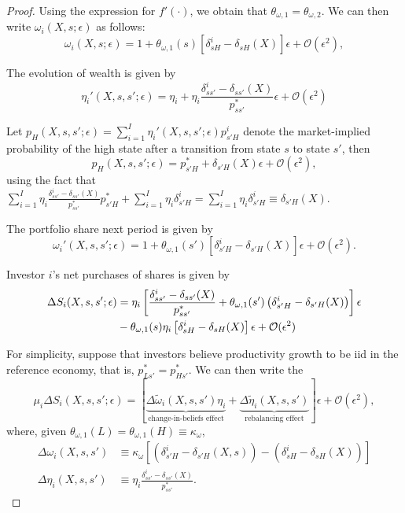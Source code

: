 \begin{proof}
Using the expression for $f'(\cdot)$, we obtain that $\theta_{\omega,1} = \theta_{\omega,2}$. We can then write $\omega_{i}(X,s;\epsilon)$ as follows:
\begin{equation}
    \omega_{i}(X,s; \epsilon) = 1 +\theta_{\omega,1}(s) \left[ \delta_{sH}^i - \delta_{sH}(X) \right] \epsilon + \mathcal{O}(\epsilon^2),
\end{equation}

The evolution of wealth is given by 
\begin{equation}
    \eta_i'(X,s,s';\epsilon) = \eta_i + \eta_i \frac{\delta_{s s'}^i - \delta_{ss'}(X)}{p_{ss'}^*} \epsilon + \mathcal{O}(\epsilon^2)
\end{equation}

Let $p_H(X,s,s';\epsilon) = \sum_{i=1}^I \eta_i'(X,s,s';\epsilon) p_{s'H}^i$ denote the market-implied probability of the high state after a transition from state $s$ to state $s'$, then
\begin{equation}
    p_H(X,s,s';\epsilon) = p_{s'H}^* + \delta_{s'H}(X)\epsilon + \mathcal{O}(\epsilon^2),
\end{equation}
using the fact that $\sum_{i=1}^I \eta_i \frac{\delta_{ss'}^i - \delta_{ss'}(X)}{p^*_{ss'}} p_{s'H}^* +  \sum_{i=1}^I \eta_i \delta_{s'H}^i =  \sum_{i=1}^I \eta_i \delta_{s'H}^i  \equiv \delta_{s'H}(X)$.

The portfolio share next period is given by
\begin{equation}
    \omega_i'(X,s,s'; \epsilon) = 1 + \theta_{\omega,1}(s') \left[ \delta_{s'H}^i - \delta_{s'H}(X) \right] \epsilon + \mathcal{O}(\epsilon^2).
\end{equation}

Investor $i$'s net purchases of shares is given by
\begin{align}\small
    \Delta S_i(X,s,s'; \epsilon) &= \eta_i\left[\frac{\delta_{s s'}^i - \delta_{ss'}(X)}{p_{ss'}^*}+\theta_{\omega,1}(s')\left( \delta_{s'H}^i - \delta_{s'H}(X) \right) \right]\epsilon\nonumber\\
    &- \theta_{\omega,1}(s) \eta_i\left[ \delta_{sH}^i - \delta_{sH}(X) \right] \epsilon + \mathcal{O}(\epsilon^2)
\end{align}

For simplicity, suppose that investors believe productivity growth to be iid in the reference economy, that is, $p_{Ls'}^* = p_{Hs'}^* $. We can then write the  
\begin{equation}
    \mu_i \Delta S_i(X,s,s';\epsilon) =\left[\underbrace{\Delta \tilde{\omega}_i(X,s,s') \eta_i}_{\text{change-in-beliefs effect}}+
    \underbrace{\Delta \tilde{\eta}_i(X,s,s')}_{\text{rebalancing effect}}\right] \epsilon + \mathcal{O}(\epsilon^2),
\end{equation}
where, given $\theta_{\omega,1}(L) = \theta_{\omega,1}(H) \equiv \kappa_\omega$,
\begin{align}
    \Delta \omega_i(X,s,s') &\equiv \kappa_\omega\left[\left( \delta_{s'H}^i - \delta_{s'H}(X,s) \right) - \left( \delta_{sH}^i - \delta_{sH}(X) \right) \right]\\
    \Delta \eta_i(X,s,s') &\equiv \eta_i \frac{\delta_{s s'}^i - \delta_{ss'}(X)}{p_{ss'}^*}.
\end{align}


\end{proof}
